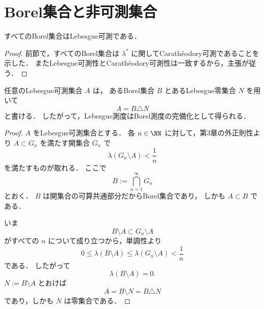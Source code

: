 \section{Borel集合と非可測集合}

\begin{theorem}[Borel集合]
すべてのBorel集合はLebesgue可測である．
\end{theorem}
\begin{proof}
前節で，すべてのBorel集合は $\lambda^*$ に関してCarathéodory可測であることを示した．
またLebesgue可測性とCarathéodory可測性は一致するから，主張が従う．
\end{proof}

\begin{theorem}[Borel測度の完備化]
任意のLebesgue可測集合 $A$ は，
あるBorel集合 $B$ とあるLebesgue零集合 $N$ を用いて
\[
A=B\triangle N
\]
と書ける．
したがって，Lebesgue測度はBorel測度の完備化として得られる．
\end{theorem}
\begin{proof}
$A$ をLebesgue可測集合とする．
各 $n\in\NN$ に対して，第3章の外正則性より
$A \subset G_n$ を満たす開集合 $G_n$ で
\[
\lambda(G_n\setminus A)<\frac1n
\]
を満たすものが取れる．
ここで
\[
B:=\bigcap_{n=1}^{\infty}G_n
\]
とおく．
$B$ は開集合の可算共通部分だからBorel集合であり，
しかも $A \subset B$ である．

いま
\[
B\setminus A \subset G_n\setminus A
\]
がすべての $n$ について成り立つから，単調性より
\[
0\le \lambda(B\setminus A)\le \lambda(G_n\setminus A)<\frac1n
\]
である．
したがって
\[
\lambda(B\setminus A)=0.
\]
$N:=B\setminus A$ とおけば
\[
A=B\setminus N=B\triangle N
\]
であり，しかも $N$ は零集合である．
\end{proof}

